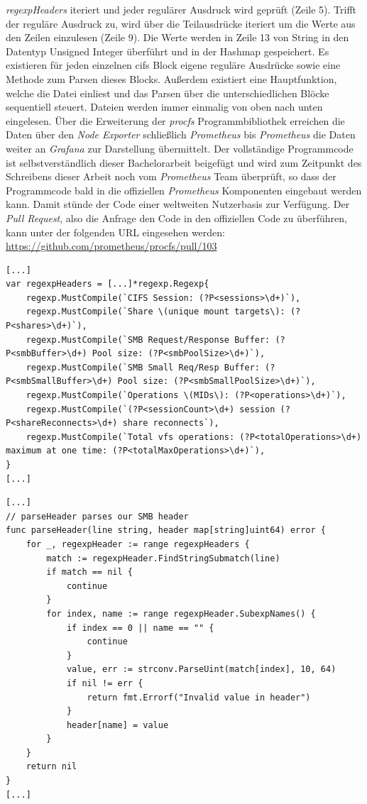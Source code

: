 \documentclass[titlepage]{report}
\begin{document}
\emph{regexpHeaders} iteriert und jeder regulärer Ausdruck wird geprüft
(Zeile 5). Trifft der reguläre Ausdruck zu, wird über die Teilausdrücke
iteriert um die Werte aus den Zeilen einzulesen (Zeile 9). Die Werte
werden in Zeile 13 von String in den Datentyp Unsigned Integer
überführt und in der Hashmap gespeichert. Es existieren für jeden
einzelnen \gls{cifs} Block eigene reguläre Ausdrücke sowie eine Methode
zum Parsen dieses Blocks. Außerdem existiert eine Hauptfunktion, welche
die Datei einliest und das Parsen über die unterschiedlichen Blöcke
sequentiell steuert. Dateien werden immer einmalig von oben nach unten
eingelesen. Über die Erweiterung der \emph{procfs} Programmbibliothek
erreichen die Daten über den \emph{Node Exporter} schließlich
\emph{Prometheus} bis \emph{Prometheus} die Daten weiter an
\emph{Grafana} zur Darstellung übermittelt. Der vollständige
Programmcode ist selbstverständlich dieser Bachelorarbeit beigefügt und
wird zum Zeitpunkt des Schreibens dieser Arbeit noch vom
\emph{Prometheus} Team überprüft, so dass der Programmcode bald
in die offiziellen \emph{Prometheus} Komponenten eingebaut werden kann.
Damit stünde der Code einer weltweiten Nutzerbasis zur Verfügung. Der
\emph{Pull Request}\cite{PRGITHUB}, also die Anfrage den Code in den
offiziellen Code zu überführen, kann unter der folgenden URL eingesehen
werden: \url{https://github.com/prometheus/procfs/pull/103}
\begin{minipage}{\linewidth}
\begin{lstlisting}[caption={Nicht vollständiger Auszug aus der Datei
cifs.go},label={lst:parserregex}]
[...]
var regexpHeaders = [...]*regexp.Regexp{
	regexp.MustCompile(`CIFS Session: (?P<sessions>\d+)`),
	regexp.MustCompile(`Share \(unique mount targets\): (?P<shares>\d+)`),
	regexp.MustCompile(`SMB Request/Response Buffer: (?P<smbBuffer>\d+) Pool size: (?P<smbPoolSize>\d+)`),
	regexp.MustCompile(`SMB Small Req/Resp Buffer: (?P<smbSmallBuffer>\d+) Pool size: (?P<smbSmallPoolSize>\d+)`),
	regexp.MustCompile(`Operations \(MIDs\): (?P<operations>\d+)`),
	regexp.MustCompile(`(?P<sessionCount>\d+) session (?P<shareReconnects>\d+) share reconnects`),
	regexp.MustCompile(`Total vfs operations: (?P<totalOperations>\d+) maximum at one time: (?P<totalMaxOperations>\d+)`),
}
[...]
\end{lstlisting}
\end{minipage}
\begin{minipage}{\linewidth}
\begin{lstlisting}[caption={Nicht vollständiger Auszug aus der Datei
cifs\_parse.go},label={lst:parserheader}]
[...]
// parseHeader parses our SMB header
func parseHeader(line string, header map[string]uint64) error {
	for _, regexpHeader := range regexpHeaders {
		match := regexpHeader.FindStringSubmatch(line)
		if match == nil {
			continue
		}
		for index, name := range regexpHeader.SubexpNames() {
			if index == 0 || name == "" {
				continue
			}
			value, err := strconv.ParseUint(match[index], 10, 64)
			if nil != err {
				return fmt.Errorf("Invalid value in header")
			}
			header[name] = value
		}
	}
	return nil
}
[...]
\end{lstlisting}
\end{minipage}
\end{document}

